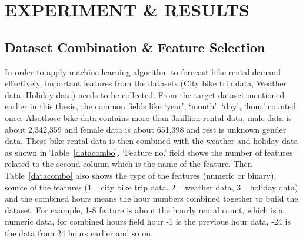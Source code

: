 %
%
%

\chapter{\uppercase{Experiment \& Results}}

\label{sec:results}



\section{Dataset Combination \& Feature Selection}
\label{Datacombination}

In order to apply machine learning algorithm to forecast bike rental demand effectively, important features from the datasets (City bike trip data, Weather data, Holiday data) needs to be collected. From the target dataset mentioned earlier in this thesis, the common fields like `year', `month', `day', `hour' counted once. Alsothose bike data contains more than $3$million rental data, male data is about 2,342,359 and female data is about 651,398 and rest is unknown gender data. These bike rental data is then combined with the weather and holiday data as shown in Table~\ref{datacombo}. `Feature no.' field shows the number of features related to the second column which is the name of the feature. Then Table~\ref{datacombo} also shows the type of the features (numeric or binary), source of the features (1= city bike trip data, 2= weather data, 3= holiday data) and the combined hours means the hour numbers combined together to build the dataset. For example, 1-8 feature is about the hourly rental count, which is a numeric data, for combined hours field hour -1 is the previous hour data, -24 is the data from 24 hours earlier and so on. 




